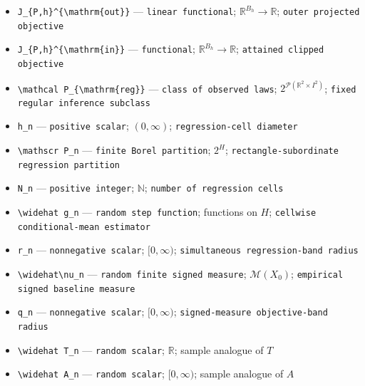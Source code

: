 \documentclass{article}
\begin{document}
\begin{itemize}
  \item \texttt{J\_\allowbreak{}\{P,\allowbreak{}h\}\allowbreak{}\textasciicircum{}\{\textbackslash{}\allowbreak{}mathrm\{out\}\allowbreak{}\}\allowbreak{}} --- \texttt{linear functional}; \(\mathbb R^{B_h}\to\mathbb R\); \texttt{outer projected objective}
  \item \texttt{J\_\allowbreak{}\{P,\allowbreak{}h\}\allowbreak{}\textasciicircum{}\{\textbackslash{}\allowbreak{}mathrm\{in\}\allowbreak{}\}\allowbreak{}} --- \texttt{functional}; \(\mathbb R^{B_h}\to\mathbb R\); \texttt{attained clipped objective}
  \item \texttt{\textbackslash{}\allowbreak{}mathcal P\_\allowbreak{}\{\textbackslash{}\allowbreak{}mathrm\{reg\}\allowbreak{}\}\allowbreak{}} --- \texttt{class of observed laws}; \(2^{\mathcal P(\mathbb R^2\times I^2)}\); \texttt{fixed regular inference subclass}
  \item \texttt{h\_\allowbreak{}n} --- \texttt{positive scalar}; \((0,\infty)\); \texttt{regression-\allowbreak{}cell diameter}
  \item \texttt{\textbackslash{}\allowbreak{}mathscr P\_\allowbreak{}n} --- \texttt{finite Borel partition}; \(2^H\); \texttt{rectangle-\allowbreak{}subordinate regression partition}
  \item \texttt{N\_\allowbreak{}n} --- \texttt{positive integer}; \(\mathbb N\); \texttt{number of regression cells}
  \item \texttt{\textbackslash{}\allowbreak{}widehat g\_\allowbreak{}n} --- \texttt{random step function}; functions on \(H\); \texttt{cellwise conditional-\allowbreak{}mean estimator}
  \item \texttt{r\_\allowbreak{}n} --- \texttt{nonnegative scalar}; \([0,\infty)\); \texttt{simultaneous regression-\allowbreak{}band radius}
  \item \texttt{\textbackslash{}\allowbreak{}widehat\textbackslash{}\allowbreak{}nu\_\allowbreak{}n} --- \texttt{random finite signed measure}; \(\mathcal M(X_0)\); \texttt{empirical signed baseline measure}
  \item \texttt{q\_\allowbreak{}n} --- \texttt{nonnegative scalar}; \([0,\infty)\); \texttt{signed-\allowbreak{}measure objective-\allowbreak{}band radius}
  \item \texttt{\textbackslash{}\allowbreak{}widehat T\_\allowbreak{}n} --- \texttt{random scalar}; \(\mathbb R\); sample analogue of \(T\)
  \item \texttt{\textbackslash{}\allowbreak{}widehat A\_\allowbreak{}n} --- \texttt{random scalar}; \([0,\infty)\); sample analogue of \(A\)

\end{itemize}
\end{document}
